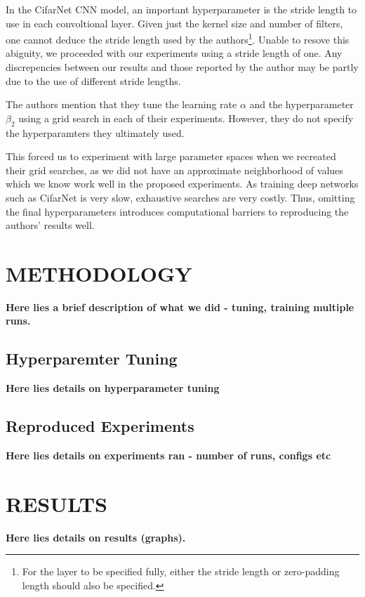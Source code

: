 \documentclass[letterpaper, 10 pt, conference]{ieeeconf}  %
\begin{document}
In the CifarNet CNN model, an important hyperparameter is the stride length to use in each convoltional layer. Given just the kernel size and number of filters, one cannot deduce the stride length used by the authors\footnote{For the layer to be specified fully, either the stride length or zero-padding length should also be specified.}. Unable to resove this abiguity, we proceeded with our experiments using a stride length of one. Any discrepencies between our results and those reported by the author may be partly due to the use of different stride lengths. 

The authors mention that they tune the learning rate $\alpha$ and the hyperparameter $\beta_2$ using a grid search in each of their experiments. However, they do not specify the hyperparamters they ultimately used. 

This forced us to experiment with large parameter spaces when we recreated their grid searches, as we did not have an approximate neighborhood of values which we know work well in the proposed experiments. As training deep networks such as CifarNet is very slow, exhaustive searches are very costly. Thus, omitting the final hyperparameters introduces computational barriers to reproducing the authors' results well. 

\section{METHODOLOGY}

\textbf{Here lies a brief description of what we did - tuning, training multiple runs.}

\subsection{Hyperparemter Tuning}

\textbf{Here lies details on hyperparameter tuning}

\subsection{Reproduced Experiments}

\textbf{Here lies details on experiments ran - number of runs, configs etc}

\section{RESULTS}

\textbf{Here lies details on results (graphs).}
\end{document}
